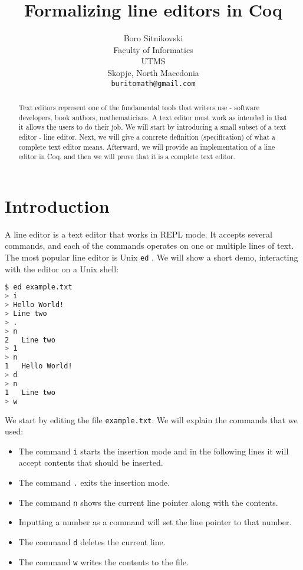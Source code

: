 \documentclass{article}
\title{Formalizing line editors in Coq}
\author{
  Boro Sitnikovski \\
  Faculty of Informatics\\
  UTMS\\
  Skopje, North Macedonia \\
  \texttt{buritomath@gmail.com} \\
}
\theoremstyle{definition}
\begin{document}
\maketitle

\begin{abstract}
Text editors represent one of the fundamental tools that writers use - software developers, book authors, mathematicians. A text editor must work as intended in that it allows the users to do their job. We will start by introducing a small subset of a text editor - line editor. Next, we will give a concrete definition (specification) of what a complete text editor means. Afterward, we will provide an implementation of a line editor in Coq, and then we will prove that it is a complete text editor.
\end{abstract}


\section{Introduction}

A line editor is a text editor that works in REPL mode. It accepts several commands, and each of the commands operates on one or multiple lines of text. The most popular line editor is Unix \texttt{ed} \cite{b1}. We will show a short demo, interacting with the editor on a Unix shell:

\begin{lstlisting}[language=sh]
$ ed example.txt
> i
> Hello World!
> Line two
> .
> n
2	Line two
> 1
> n
1	Hello World!
> d
> n
1	Line two
> w
\end{lstlisting}

We start by editing the file \texttt{example.txt}. We will explain the commands that we used:

\begin{itemize}
\item The command \texttt{i} starts the insertion mode and in the following lines it will accept contents that should be inserted.
\item The command \texttt{.} exits the insertion mode.
\item The command \texttt{n} shows the current line pointer along with the contents.
\item Inputting a number as a command will set the line pointer to that number.
\item The command \texttt{d} deletes the current line.
\item The command \texttt{w} writes the contents to the file.
\end{itemize}
\end{document}
